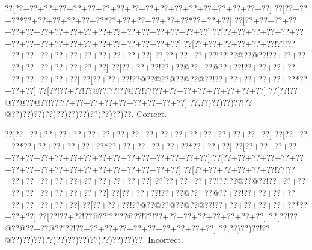 \documentclass[a5paper]{article}
\begin{document}
\begin{center}
{\goo
\0??[\0??+\0??+\0??+\0??+\0??+\0??+\0??+\0??+\0??+\0??+\0??+\0??+\0??+\0??+\0??+\0??+\0??+\0??]
\0??[\0??+\0??+\0??*\0??+\0??+\0??+\0??+\0??+\0??*\0??+\0??+\0??+\0??+\0??+\0??*\0??+\0??+\0??]
\0??[\0??+\0??+\0??+\0??+\0??+\0??+\0??+\0??+\0??+\0??+\0??+\0??+\0??+\0??+\0??+\0??+\0??+\0??]
\0??[\0??+\0??+\0??+\0??+\0??+\0??+\0??+\0??+\0??+\0??+\0??+\0??+\0??+\0??+\0??+\0??+\0??+\0??]
\0??[\0??+\0??+\0??+\0??+\0??+\0??!\0??!\0??+\0??+\0??+\0??+\0??+\0??+\0??+\0??+\0??+\0??+\0??]
\0??[\0??+\0??+\0??+\0??!\0??!\0??@\0??@\0??!\0??+\0??+\0??+\0??+\0??+\0??+\0??+\0??+\0??+\0??]
\0??[\0??+\0??+\0??!\0??+\0??@\0??+\0??@\0??+\0??!\0??+\0??+\0??+\0??+\0??+\0??+\0??+\0??+\0??]
\0??[\0??+\0??+\0??!\0??@\0??@\0??@\0??@\0??@\0??!\0??+\0??+\0??+\0??+\0??+\0??*\0??+\0??+\0??]
\0??[\0??!\0??+\0??!\0??@\0??!\0??!\0??@\0??!\0??!\0??+\0??+\0??+\0??+\0??+\0??+\0??+\0??]
\0??[\0??!\0??@\0??@\0??@\0??!\0??!\0??+\0??+\0??+\0??+\0??+\0??+\0??+\0??+\0??]
\0??,\0??)\0??)\0??)\0??!\0??@\0??)\0??)\0??)\0??)\0??)\0??)\0??)\0??)\0??)\0??)\0??.
}
Correct. 

\end{center}
\begin{center}
{\goo
\0??[\0??+\0??+\0??+\0??+\0??+\0??+\0??+\0??+\0??+\0??+\0??+\0??+\0??+\0??+\0??+\0??+\0??+\0??]
\0??[\0??+\0??+\0??*\0??+\0??+\0??+\0??+\0??+\0??*\0??+\0??+\0??+\0??+\0??+\0??*\0??+\0??+\0??]
\0??[\0??+\0??+\0??+\0??+\0??+\0??+\0??+\0??+\0??+\0??+\0??+\0??+\0??+\0??+\0??+\0??+\0??+\0??]
\0??[\0??+\0??+\0??+\0??+\0??+\0??+\0??+\0??+\0??+\0??+\0??+\0??+\0??+\0??+\0??+\0??+\0??+\0??]
\0??[\0??+\0??+\0??+\0??+\0??+\0??!\0??!\0??+\0??+\0??+\0??+\0??+\0??+\0??+\0??+\0??+\0??+\0??]
\0??[\0??+\0??+\0??+\0??!\0??!\0??@\0??@\0??!\0??+\0??+\0??+\0??+\0??+\0??+\0??+\0??+\0??+\0??]
\0??[\0??+\0??+\0??!\0??+\0??@\0??+\0??@\0??+\0??!\0??+\0??+\0??+\0??+\0??+\0??+\0??+\0??+\0??]
\0??[\0??+\0??+\0??!\0??@\0??@\0??@\0??@\0??@\0??!\0??+\0??+\0??+\0??+\0??+\0??*\0??+\0??+\0??]
\0??[\0??!\0??+\0??!\0??@\0??!\0??!\0??@\0??!\0??!\0??+\0??+\0??+\0??+\0??+\0??+\0??+\0??]
\0??[\0??!\0??@\0??@\0??+\0??@\0??!\0??!\0??+\0??+\0??+\0??+\0??+\0??+\0??+\0??+\0??+\0??]
\0??,\0??)\0??)\0??!\0??@\0??)\0??)\0??)\0??)\0??)\0??)\0??)\0??)\0??)\0??)\0??)\0??.
}
Incorrect. 

\end{center}
\newpage
\end{document}
